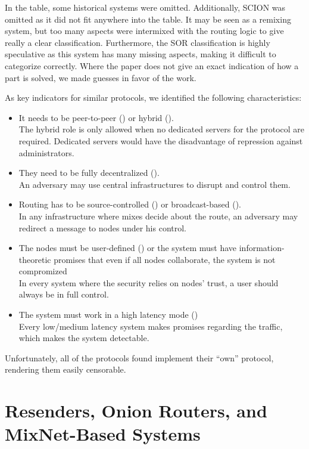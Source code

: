 In the table, some historical systems were omitted. Additionally, SCION was omitted as it did not fit anywhere into the table. It may be seen as a remixing system, but too many aspects were intermixed with the routing logic to give really a clear classification. Furthermore, the SOR classification is highly speculative as this system has many missing aspects, making it difficult to categorize correctly. Where the paper does not give an exact indication of how a part is solved, we made guesses in favor of the work.

As key indicators for similar protocols, we identified the following characteristics:
\begin{itemize}
	\item It needs to be peer-to-peer (\rolePtp) or hybrid (\roleHybrid).\\
	The hybrid role is only allowed when no dedicated servers for the protocol are required. Dedicated servers would have the disadvantage of repression against administrators.
	\item They need to be fully decentralized (\decentralizationDecentr).\\
	An adversary may use central infrastructures to disrupt and control them.
	\item Routing has to be source-controlled (\routingRoutesrc) or broadcast-based (\routingRoutebc).\\
	In any infrastructure where mixes decide about the route, an adversary may redirect a message to nodes under his control.
	\item The nodes must be user-defined (\nsnodesusr) or the system must have information-theoretic promises that even if all nodes collaborate, the system is not compromized\\
	In every system where the security relies on nodes' trust, a user should always be in full control.
	\item The system must work in a high latency mode (\perflath)\\
	Every low/medium latency system makes promises regarding the traffic, which makes the system detectable.
\end{itemize}

Unfortunately, all of the protocols found implement their ``own'' protocol, rendering them easily censorable. 

\section{Resenders, Onion Routers, and MixNet-Based Systems}\label{sec:remailersAndMixnets}

